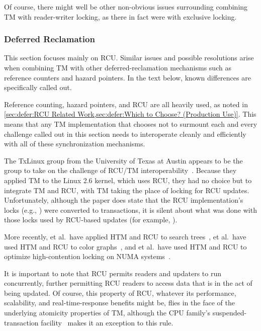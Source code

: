 Of course, there might well be other non-obvious issues surrounding
combining TM with reader-writer locking, as there in fact were with
exclusive locking.

\subsubsection{Deferred Reclamation}
\label{sec:future:Deferred Reclamation}

This section focuses mainly on RCU\@.
Similar issues and possible resolutions arise when combining TM with
other deferred-reclamation mechanisms such as reference counters and
hazard pointers.
In the text below, known differences are specifically called out.

Reference counting, hazard pointers, and RCU are all heavily used, as noted in
\cref{sec:defer:RCU Related Work,sec:defer:Which to Choose? (Production Use)}.
This means that any TM implementation that chooses not to surmount each
and every challenge called out in this section needs to interoperate
cleanly and efficiently with all of these synchronization mechanisms.

The TxLinux group from the University of Texas at Austin appears to be
the group to take on the challenge of RCU/TM
interoperability~\cite{ChistopherJRossbach2007a}.
Because they applied TM to the Linux 2.6 kernel, which uses RCU, they
had no choice but to integrate TM and RCU, with TM taking the place of
locking for RCU updates.
Unfortunately, although the paper does state that the RCU implementation's
locks (e.g., ) were converted to transactions,
it is silent about what was done with those locks used by RCU-based updates
(for example, ).

More recently,  et al.~have applied
HTM and RCU to search trees~\cite{Siakavaras2017CombiningHA,DimitriosSiakavaras2020RCU-HTM-B+Trees},
 et al.~have used HTM and RCU to color
graphs~\cite{ChristinaGiannoula2018HTM-RCU-graphcoloring},
and
 et al.~have used HTM and RCU to optimize high-contention
locking on NUMA systems~\cite{SeongJaePark2020HTMRCUlock}.

It is important to note that RCU permits readers and updaters to run
concurrently, further permitting RCU readers to access data that is in
the act of being updated.
Of course, this property of RCU, whatever its performance, scalability,
and real-time-response benefits might be, flies in the face of the
underlying atomicity properties of TM, although the  CPU family's
suspended-transaction facility~\cite{Le:2015:TMS:3266491.3266500} makes
it an exception to this rule.

